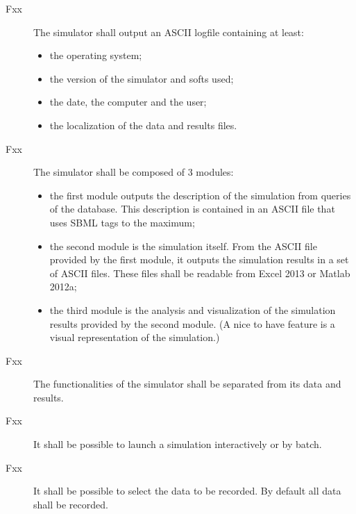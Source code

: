 \begin{description}
  \item[Fxx] The simulator shall output an ASCII logfile containing at least:
  \begin{itemize}
    \item the operating system;
    \item the version of the simulator and softs used;
    \item the date, the computer and the user;
    \item the localization of the data and results files.
  \end{itemize}
  \item[Fxx] The simulator shall be composed of 3 modules:
  \begin{itemize}
    \item the first module outputs the description of the simulation from queries of the database. This description is contained in an ASCII file that uses SBML tags to the maximum;
    \item the second module is the simulation itself. From the ASCII file provided by the first module, it outputs the simulation results in a set of ASCII files. These files shall be readable from Excel 2013 or Matlab 2012a;
    \item the third module is the analysis and visualization of the simulation results provided by the second module. (A nice to have feature is a visual representation of the simulation.)
  \end{itemize}
  \item[Fxx] The functionalities of the simulator shall be separated from its data and results.
  \item[Fxx] It shall be possible to launch a simulation interactively or by batch.
  \item[Fxx] It shall be possible to select the data to be recorded. By default all data shall be recorded.
  \\


\end{description}
